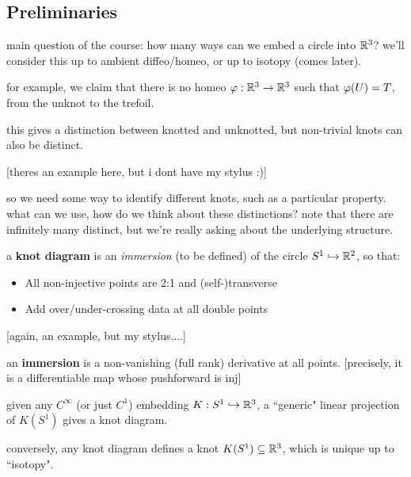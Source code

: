 
\subsection{Preliminaries}

main question of the course: how many ways can we embed a circle into $\mathbb{R}^{3}$?
we'll consider this up to ambient diffeo/homeo, or up to isotopy (comes later).

for example, we claim that there is no homeo $\varphi:\mathbb{R}^{3}\rightarrow\mathbb{R}^{3}$ such
that $\varphi(U)=T$, from the unknot to the trefoil.

this gives a distinction between knotted and unknotted, but non-trivial knots
can also be distinct.

[theres an example here, but i dont have my stylus :)]

so we need some way to identify different knots, such as a particular property.
what can we use, how do we think about these distinctions?
note that there are infinitely many distinct, but we're really asking about the
underlying structure.

\begin{defn}
    a \textbf{knot diagram} is an \textit{immersion} (to be defined) of the
    circle $S^{1}\hookrightarrow\mathbb{R}^{2}$, so that:
    \begin{itemize}
        \item All non-injective points are 2:1 and (self-)transverse
        \item Add over/under-crossing data at all double points
    \end{itemize}
\end{defn}

[again, an example, but my stylus....]

\begin{defn}
    an \textbf{immersion} is a non-vanishing (full rank) derivative at all
    points. [precisely, it is a differentiable map whose pushforward is inj]
\end{defn}

\begin{prop}
    given any $C^{\infty}$ (or just $C^{1}$) embedding $K:S^{1}\hookrightarrow\mathbb{R}^{3}$,
    a ``generic" linear projection of $K(S^{1})$ gives a knot diagram.

    conversely, any knot diagram defines a knot $K(S^{1})\subseteq\mathbb{R}^{3}$,
    which is unique up to ``isotopy".
\end{prop}


